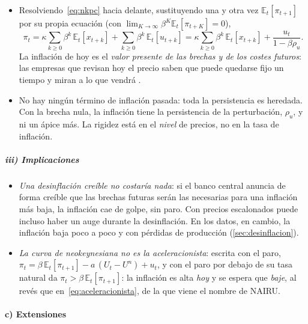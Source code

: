\documentclass[11pt]{article}
\begin{document}
\begin{itemize}
\item Resolviendo~\eqref{eq:nkpc} hacia delante, sustituyendo una y otra vez $\mathbb{E}_t[\pi_{t+1}]$ por su propia ecuación (con $\lim_{K\to\infty}\beta^K\mathbb{E}_t[\pi_{t+K}]=0$),
  \begin{equation}\label{eq:nkpc-adelante}
  \pi_t=\kappa\sum_{k\geq0}\beta^k\,\mathbb{E}_t[x_{t+k}]+\sum_{k\geq0}\beta^k\,\mathbb{E}_t[u_{t+k}]
  =\kappa\sum_{k\geq0}\beta^k\,\mathbb{E}_t[x_{t+k}]+\frac{u_t}{1-\beta\rho_u}.
  \end{equation}
  La inflación de hoy es el \emph{valor presente de las brechas y de los costes futuros}: las empresas que revisan hoy el precio saben que puede quedarse fijo un tiempo y miran a lo que vendrá .
\item No hay ningún término de inflación pasada: toda la persistencia es heredada. Con la brecha nula, la inflación tiene la persistencia de la perturbación, $\rho_u$, y ni un ápice más. La rigidez está en el \emph{nivel} de precios, no en la tasa de inflación.
\end{itemize}

\subparagraph{iii) Implicaciones}

\begin{itemize}
\item \emph{Una desinflación creíble no costaría nada}: si el banco central anuncia de forma creíble que las brechas futuras serán las necesarias para una inflación más baja, la inflación cae de golpe, sin paro. Con precios escalonados puede incluso haber un auge durante la desinflación\nocite{Ball1994Credible}. En los datos, en cambio, la inflación baja poco a poco y con pérdidas de producción (\ref{sec:desinflacion}).
\item \emph{La curva de  neokeynesiana no es la aceleracionista}: escrita con el paro, $\pi_t=\beta\,\mathbb{E}_t[\pi_{t+1}]-a\,(U_t-U^n)+u_t$, y con el paro por debajo de su tasa natural da $\pi_t>\beta\,\mathbb{E}_t[\pi_{t+1}]$: la inflación es alta \emph{hoy} y se espera que \emph{baje}, al revés que en~\eqref{eq:aceleracionista}, de la que viene el nombre de NAIRU\nocite{Mankiw2001Inexorable}.
\end{itemize}

\paragraph{c) Extensiones}
\end{document}
